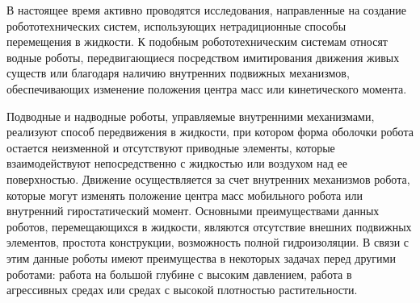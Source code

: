 
{\actuality} 

В настоящее время активно проводятся исследования, направленные на создание робототехнических систем, использующих нетрадиционные способы перемещения в жидкости. К подобным робототехническим системам относят водные роботы, передвигающиеся посредством имитирования движения живых существ или благодаря наличию внутренних подвижных механизмов, обеспечивающих изменение положения центра масс или кинетического момента. 


Подводные и надводные роботы, управляемые внутренними механизмами, реализуют способ передвижения в жидкости, при котором форма оболочки робота остается неизменной и отсутствуют приводные элементы, которые взаимодействуют непосредственно с жидкостью или воздухом над ее поверхностью. Движение осуществляется за счет внутренних механизмов робота, которые могут изменять положение центра масс мобильного робота или внутренний гиростатический момент. Основными преимуществами данных роботов, перемещающихся в жидкости, являются отсутствие внешних подвижных элементов, простота конструкции, возможность полной гидроизоляции. В связи с этим данные роботы имеют преимущества в некоторых задачах перед другими роботами: работа на большой глубине с высоким давлением, работа в агрессивных средах или средах с высокой плотностью растительности.



